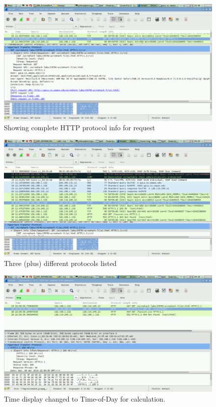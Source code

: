 \documentclass[12pt]{article}
\begin{document}

\begin{figure}[ht]
\centering
\includegraphics[scale=0.2]{Lab1Fullv2.png}
\caption{Showing complete HTTP protocol info for request}
\end{figure}

\begin{figure}[ht]
\centering
\includegraphics[scale=0.2]{Lab1Protocols.png}
\caption{Three (plus) different protocols listed}
\end{figure}

\begin{figure}[ht]
\centering
\includegraphics[scale=0.2]{Lab1Time.png}
\caption{Time display changed to Time-of-Day for calculation.}
\end{figure}
\end{document}
